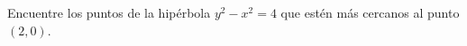 \item Encuentre los puntos de la hipérbola $y^2 - x^2 = 4$ que estén más cercanos al punto $(2, 0)$.
